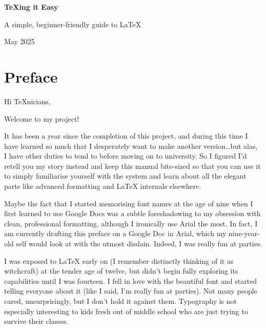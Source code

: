 \documentclass[letterpaper, 12pt]{article}
\begin{document}
\begin{titlepage}
    \centering
    \vspace*{2cm}
    {\Huge \bfseries \TeX ing it Easy\par}
    \vspace{2cm}
    {\Large A simple, beginner-friendly guide to \LaTeX \par}
    \vfill
    {\large May 2025\par}
\end{titlepage}

\tableofcontents

\fancyhf{}
\fancyfoot[C]{\thepage}

\nocite{*}

\newpage

\section*{Preface}

\fancyhf{}
\fancyfoot[C]{\thepage}


Hi TeXnicians,

Welcome to my project!

It has been a year since the completion of this project, and during this time I have learned so much that I desperately want to make another version…but alas, I have other duties to tend to before moving on to university. So I figured I’d retell you my story instead and keep this manual bite-sized so that you can use it to simply familiarise yourself with the system and learn about all the elegant parts like advanced formatting and LaTeX internals elsewhere.

Maybe the fact that I started memorising font names at the age of nine when I first learned to use Google Docs was a subtle foreshadowing to my obsession with clean, professional formatting, although I ironically use Arial the most. In fact, I am currently drafting this preface on a Google Doc in Arial, which my nine-year-old self would look at with the utmost disdain. Indeed, I was really fun at parties.

I was exposed to \LaTeX{} early on (I remember distinctly thinking of it as witchcraft) at the tender age of twelve, but didn’t begin fully exploring its capabilities until I was fourteen. I fell in love with the beautiful font and started telling everyone about it (like I said, I’m really fun at parties). Not many people cared, unsurprisingly, but I don’t hold it against them. Typography is not especially interesting to kids fresh out of middle school who are just trying to survive their classes.
\end{document}

